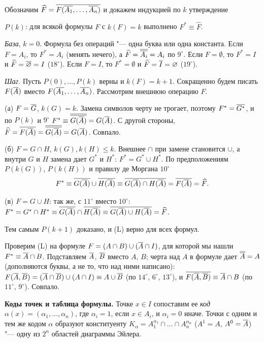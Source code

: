 \begin{solution}[1 (\S\,3)]
Обозначим $\widehat F=\overline{F(\overline{A_1},\dots,\overline{A_n})}$ и докажем индукцией
по $k$ утверждение
\begin{keystmt}
$P(k)$: для всякой формулы $F$ с $k(F)=k$ выполнено $F^*\equiv\widehat F$.
\end{keystmt}

\emph{База}, $k=0$. Формула без операций "--- одна буква или одна
константа. Если $F=A_i$, то $F^*=A_i$ (менять нечего), а
$\widehat F=\overline{\overline{A_i}}=A_i$ по $9^\circ$. Если $F=\emptyset$, то
$F^*=I$ и $\widehat F=\overline{\varnothing}=I$ ($18^\circ$). Если $F=I$, то
$F^*=\emptyset$ и $\widehat F=\overline{I}=\varnothing$ ($19^\circ$).

\emph{Шаг.} Пусть $P(0),\dots,P(k)$ верны и $k(F)=k+1$. Сокращенно будем
писать $F(\overline{A})$ вместо $F(\overline{A_1},\dots,\overline{A_n})$. Рассмотрим внешнюю
операцию $F$.

(а) $F=\overline{G}$, $k(G)=k$. Замена символов черту не трогает, поэтому
$F^*=\overline{G^*}$, и по $P(k)$ и $9^\circ$
$F^*\equiv\overline{\overline{G(\overline{A})}}=G(\overline{A})$. С другой стороны,
$\widehat F=\overline{F(\overline{A})}=\overline{\overline{G(\overline{A})}}=G(\overline{A})$. Совпало.

(б) $F=G\cap H$, $k(G),k(H)\le k$. Внешнее $\cap$ при замене становится
$\cup$, а внутри $G$ и $H$ замена дает $G^*$ и $H^*$: $F^*=G^*\cup H^*$.
По предположениям $P(k(G))$, $P(k(H))$ и правилу де Моргана $10^\circ$
\[
F^*\equiv\overline{G(\overline{A})}\cup\overline{H(\overline{A})}\equiv\overline{G(\overline{A})\cap H(\overline{A})}=
\overline{F(\overline{A})}=\widehat F .
\]

(в) $F=G\cup H$: так же, с $11^\circ$ вместо $10^\circ$:
$F^*=G^*\cap H^*\equiv\overline{G(\overline{A})}\cap\overline{H(\overline{A})}\equiv
\overline{G(\overline{A})\cup H(\overline{A})}=\widehat F$.

Тем самым $P(k+1)$ доказано, и (L) верно для всех формул.

Проверим (L) на формуле $F=(A\cap B)\cup(\overline{A}\cap I)$, для которой мы
нашли $F^*\equiv\overline{A}\cap B$. Подставляем $\overline{A}$, $\overline{B}$ вместо $A$,
$B$; черта над $A$ в формуле дает $\overline{\overline{A}}=A$ (дополняются буквы, а не
то, что над ними написано):
$F(\overline{A},\overline{B})=(\overline{A}\cap\overline{B})\cup(A\cap I)\equiv A\cup\overline{B}$
(по $14^\circ$, $6^\circ$, $13^\circ$), и $\overline{F(\overline{A},\overline{B})}\equiv\overline{A}\cap B$
(по $11^\circ$, $9^\circ$). Совпало.

\textbf{Коды точек и таблица формулы.} Точке $x\in I$ сопоставим ее
\emph{код} $\alpha(x)=(\alpha_1,\dots,\alpha_n)$, где $\alpha_i=1$, если
$x\in A_i$, и $\alpha_i=0$ иначе. Точки с одним и тем же кодом $\alpha$
образуют конституенту $K_\alpha=A_1^{\alpha_1}\cap\dots\cap A_n^{\alpha_n}$
($A^1=A$, $A^0=\overline{A}$) "--- одну из $2^n$ областей диаграммы Эйлера.


\end{solution}
